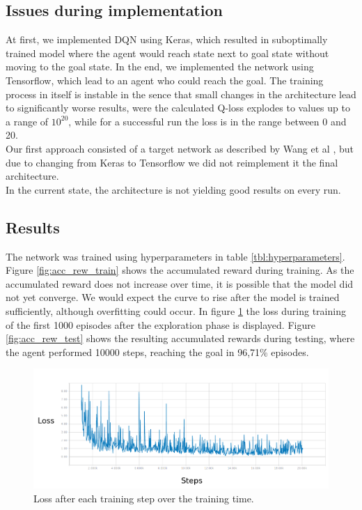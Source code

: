 \documentclass[a4paper, 11pt]{article}
\begin{document}
\subsection{Issues during implementation}
At first, we implemented DQN using Keras, which resulted in suboptimally trained model where the agent would reach state next to goal state without moving to the goal state. In the end, we implemented the network using Tensorflow, which lead to an agent who could reach the goal. The training process in itself is instable in the sence that small changes in the architecture lead to significantly worse results, were the calculated Q-loss explodes to values up to a range of $10^{20}$, while for a successful run the loss is in the range between 0 and 20.  \\
Our first approach consisted of a target network as described by Wang et al \cite{Wang15}, but due to changing from Keras to Tensorflow we did not reimplement it the final architecture.\\
In the current state, the architecture is not yielding good results on every run.

\subsection*{Results}
The network was trained using hyperparameters in table \ref{tbl:hyperparameters}. 
Figure \ref{fig:acc_rew_train} shows the accumulated reward during training. As the accumulated reward does not increase over time, it is possible that the model did not yet converge. We would expect the curve to rise after the model is trained sufficiently, although overfitting could occur. In figure \ref{fig:train_loss} the loss during training of the first 1000 episodes after the exploration phase is displayed. Figure \ref{fig:acc_rew_test} shows the resulting accumulated rewards during testing, where the agent performed 10000 steps, reaching the goal in 96,71\% episodes.


\begin{figure}[ht!]
    \centering
    \includegraphics[width=16cm]{images/loss.png}
        \caption{Loss after each training step over the training time.}
        \label{fig:train_loss}
\end{figure}
\end{document}
